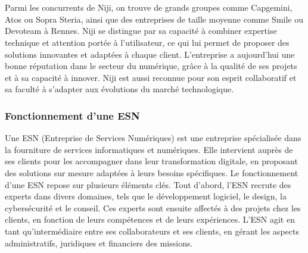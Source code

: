 \documentclass[12pt]{article}
\begin{document}
\\\\
Parmi les concurrents de Niji, on trouve de grands groupes comme Capgemini, Atos ou Sopra Steria, ainsi que des entreprises de taille moyenne comme Smile ou Devoteam à Rennes. Niji se distingue par sa capacité à combiner expertise technique et attention portée à l'utilisateur, ce qui lui permet de proposer des solutions innovantes et adaptées à chaque client. L'entreprise a aujourd'hui une bonne réputation dans le secteur du numérique, grâce à la qualité de ses projets et à sa capacité à innover. Niji est aussi reconnue pour son esprit collaboratif et sa faculté à s'adapter aux évolutions du marché technologique.
\subsubsection{Fonctionnement d'une ESN}
Une ESN (Entreprise de Services Numériques) est une entreprise spécialisée dans la fourniture de services informatiques et numériques. Elle intervient auprès de ses clients pour les accompagner dans leur transformation digitale, en proposant des solutions sur mesure adaptées à leurs besoins spécifiques. Le fonctionnement d'une ESN repose sur plusieurs éléments clés.
Tout d'abord, l'ESN recrute des experts dans divers domaines, tels que le développement logiciel, le design, la cybersécurité et le conseil. Ces experts sont ensuite affectés à des projets chez les clients, en fonction de leurs compétences et de leurs expériences. L'ESN agit en tant qu'intermédiaire entre ses collaborateurs et ses clients, en gérant les aspects administratifs, juridiques et financiers des missions.
\newpage
\end{document}
